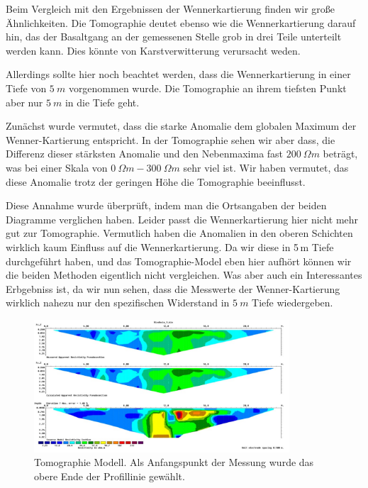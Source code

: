 Beim Vergleich mit den Ergebnissen der Wennerkartierung finden wir große Ähnlichkeiten. Die Tomographie deutet ebenso wie die Wennerkartierung darauf hin, das der Basaltgang an der gemessenen Stelle grob in drei Teile unterteilt werden kann. Dies könnte von Karstverwitterung verursacht weden.

Allerdings sollte hier noch beachtet werden, dass die Wennerkartierung in einer Tiefe von $\SI{5}{m}$ vorgenommen wurde. Die Tomographie an ihrem tiefsten Punkt aber nur $\SI{5}{m}$ in die Tiefe geht. 

Zunächst wurde vermutet, dass die starke Anomalie dem globalen Maximum der Wenner-Kartierung entspricht. In der Tomographie sehen wir aber dass, die Differenz dieser stärksten Anomalie und den Nebenmaxima fast $\SI{200}{\Omega m}$ beträgt, was bei einer Skala von $\SI{0}{\Omega m}- \SI{300}{\Omega m}$ sehr viel ist. Wir haben vermutet, das diese Anomalie trotz der geringen Höhe die Tomographie beeinflusst.


Diese Annahme wurde überprüft, indem man die Ortsangaben der beiden Diagramme verglichen haben. Leider passt die Wennerkartierung hier nicht mehr gut zur Tomographie. Vermutlich haben die Anomalien in den oberen Schichten wirklich kaum Einfluss auf die Wennerkartierung. Da wir diese in 5\,m Tiefe durchgeführt haben, und das Tomographie-Model eben hier aufhört können wir die beiden Methoden eigentlich nicht vergleichen. Was aber auch ein Interessantes Erbgebniss ist, da wir nun sehen, dass die Messwerte der Wenner-Kartierung wirklich nahezu nur den spezifischen Widerstand in $\SI{5}{m}$ Tiefe wiedergeben.


\begin{figure}[h]
\centering
\includegraphics[width=0.85\textwidth]{fig/Tomographie.pdf}
\caption{Tomographie Modell. Als Anfangspunkt der Messung wurde das obere Ende der Profillinie gewählt.}
\label{abb:Tomographie}
\end{figure}
  


